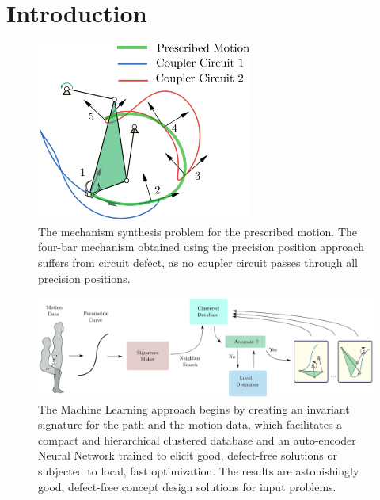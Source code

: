 \documentclass[twocolumn,10pt]{asme2ej}
\begin{document}
\section{Introduction}
\begin{figure}
\centering
\includegraphics[width=200pt]{figure/fig_circuit_defect.eps}
  \caption{The mechanism synthesis problem for the prescribed motion.
  The four-bar mechanism obtained using the precision position approach suffers from circuit defect, as no coupler circuit passes through all precision positions.}
\label{circuit_defect}
\end{figure}

\begin{figure}
\centering
\includegraphics[width=\textwidth]{figure/overall_approach.eps}
  \caption{The Machine Learning approach begins by creating an invariant signature for the path and the motion data, which facilitates a compact and hierarchical clustered database and an auto-encoder Neural Network trained to elicit good, defect-free solutions or subjected to local, fast optimization. The results are astonishingly good, defect-free concept design solutions for input problems.}
\label{overallMethod}
\end{figure}
\end{document}

